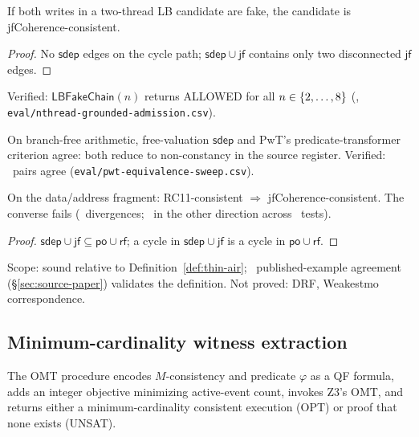 \documentclass{llncs}
\newcommand{\sdep}{\mathsf{sdep}}
\newcommand{\rf}{\mathsf{rf}}
\newcommand{\jf}{\mathsf{jf}}
\newcommand{\po}{\mathsf{po}}
\begin{document}
\begin{proposition}
\label{prop:grounded-admission}
If both writes in a two-thread LB candidate are fake, the candidate is jfCoherence-consistent.
\end{proposition}
\begin{proof}
No $\sdep$ edges on the cycle path; $\sdep \cup \jf$ contains only two disconnected $\jf$ edges.
\end{proof}

\noindent Verified: $\mathsf{LBFakeChain}(n)$ returns ALLOWED for all $n \in \{2,\ldots,8\}$ (\NThreadAllowed, \texttt{eval/nthread-grounded-admission.csv}).

\begin{proposition}
\label{prop:pwt-equiv}
On branch-free arithmetic, free-valuation $\sdep$ and PwT's predicate-transformer criterion agree: both reduce to non-constancy in the source register. Verified: \PwtAgreement~pairs agree (\texttt{eval/pwt-equivalence-sweep.csv}).
\end{proposition}

\begin{corollary}
\label{cor:rc11-containment}
On the data/address fragment: RC11-consistent $\Rightarrow$ jfCoherence-consistent.
The converse fails (\RcElevenDivergences~divergences; \RcElevenReverseDivergences~in the other direction across \RcElevenTests~tests).
\end{corollary}
\begin{proof}
$\sdep \cup \jf \subseteq \po \cup \rf$; a cycle in $\sdep \cup \jf$ is a cycle in $\po \cup \rf$.
\end{proof}

\noindent Scope: sound relative to Definition~\ref{def:thin-air}; \PublishedExampleAgreement~published-example
agreement (\S\ref{sec:source-paper}) validates the definition. Not proved: DRF,
Weakestmo correspondence.

\subsection{Minimum-cardinality witness extraction}
\label{sec:witness}

\begin{proposition}
\label{thm:minwitness}
The OMT procedure encodes $M$-consistency and predicate $\varphi$ as a QF formula,
adds an integer objective minimizing active-event count, invokes Z3's OMT,
and returns either a minimum-cardinality consistent execution (OPT) or proof
that none exists (UNSAT).
\end{proposition}
\end{document}
